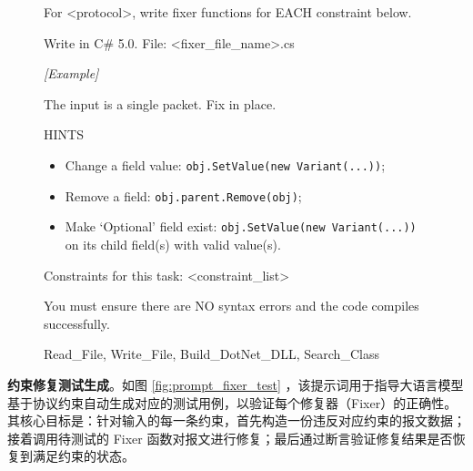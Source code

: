 \begin{figure}[H]
\centering
\begin{tcolorbox}[
    before upper=\linespread{1.5}\selectfont
]
 For <protocol>, write fixer functions for EACH constraint below.

Write in C\# 5.0.
File: <fixer\_file\_name>.cs

\textit{[Example]}

The input is a single packet. Fix in place.

HINTS

\begin{itemize}[noitemsep, label={-}, leftmargin=*]

\item Change a field value: \texttt{obj.SetValue(new Variant(...))};

\item Remove a field: \texttt{obj.parent.Remove(obj)};

\item Make `Optional' field exist: \texttt{obj.SetValue(new Variant(...))} on its child field(s) with valid value(s).
\end{itemize}


Constraints for this task:
<constraint\_list>

You must ensure there are NO syntax errors and the code compiles successfully.

\prule

 Read\_File, Write\_File, Build\_DotNet\_DLL, Search\_Class
\end{tcolorbox}
\label{fig:prompt_fixer_gen}
\end{figure}

\textbf{约束修复测试生成}。如图 \ref{fig:prompt_fixer_test} ，该提示词用于指导大语言模型基于协议约束自动生成对应的测试用例，以验证每个修复器（Fixer）的正确性。其核心目标是：针对输入的每一条约束，首先构造一份违反对应约束的报文数据；接着调用待测试的 Fixer 函数对报文进行修复；最后通过断言验证修复结果是否恢复到满足约束的状态。

